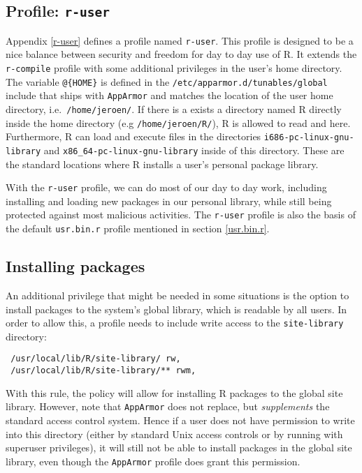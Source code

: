\documentclass{jss}
\newcommand{\R}{\textsf{R}\xspace}
\newcommand{\AppArmor}{\texttt{AppArmor}\xspace}
\begin{document}
\subsection[Profile: r-user]{Profile: \texttt{r-user}}

Appendix \ref{r-user} defines a profile named \texttt{r-user}. This profile is
designed to be a nice balance between security and freedom for day to day use of
R. It extends the \texttt{r-compile} profile with some additional privileges
in the user's home directory. The variable \texttt{@\{HOME\}} is
defined in the \texttt{/etc/apparmor.d/tunables/global} include that ships with \AppArmor and matches the location of the user home directory, i.e.\ \texttt{/home/jeroen/}.
If there is a exists a directory named \R directly inside the home directory (e.g \texttt{/home/jeroen/R/}), \R is allowed to read and here. Furthermore, \R can load and execute files in the directories
\texttt{i686-pc-linux-gnu-library} and \texttt{x86\_64-pc-linux-gnu-library}
inside of this directory. These are the standard locations where
\R installs a user's personal package library.

With the \texttt{r-user} profile, we can do most of our day
to day work, including installing and loading new packages in our personal
library, while still being protected against most malicious activities. The
\texttt{r-user} profile is also the basis of the default \texttt{usr.bin.r}
profile mentioned in section \ref{usr.bin.r}.

\subsection{Installing packages}

An additional privilege that might be needed in some situations is the option to
install packages to the system's global library, which is readable by all
users. In order to allow this, a profile needs to include write access to the
\texttt{site-library} directory:

\begin{verbatim}
 /usr/local/lib/R/site-library/ rw,
 /usr/local/lib/R/site-library/** rwm,
\end{verbatim}

With this rule, the policy will allow for installing R
packages to the global site library. However, note that \AppArmor does not
replace, but \emph{supplements} the standard access control system. Hence if a
user does not have permission to write into this directory (either by
standard Unix access controls or by running with superuser privileges), it will
still not be able to install packages in the global site library, even though
the \AppArmor profile does grant this permission.
\end{document}
